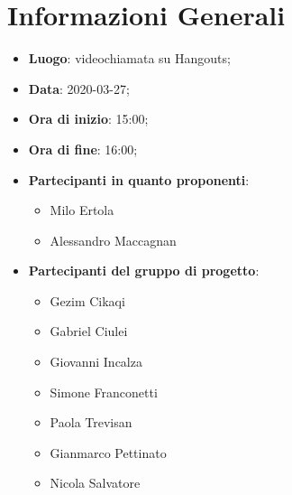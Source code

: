 \section{Informazioni Generali}
	\begin{itemize}
		\item \textbf {Luogo}: videochiamata su Hangouts;
		\item \textbf {Data}: 2020-03-27;
		\item \textbf {Ora di inizio}: 15:00;
		\item \textbf {Ora di fine}: 16:00;
		\item \textbf {Partecipanti in quanto proponenti}:
		  \begin{itemize}
		    \item Milo Ertola
		    \item Alessandro Maccagnan
		  \end{itemize}
		\item \textbf {Partecipanti del gruppo di progetto}:
			\begin{itemize}
				\item Gezim Cikaqi
				\item Gabriel Ciulei
				\item Giovanni Incalza
				\item Simone Franconetti
				\item Paola Trevisan
				\item Gianmarco Pettinato
				\item Nicola Salvatore
			\end{itemize}
	\end{itemize}
